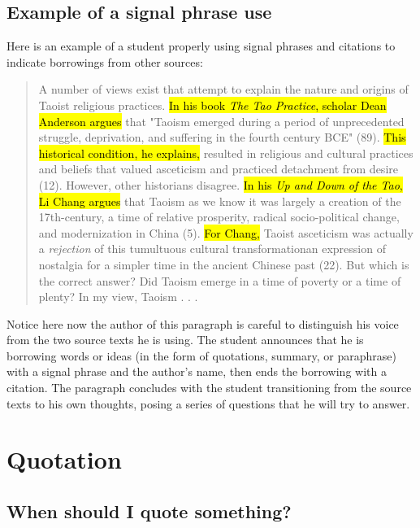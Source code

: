 \subsection{Example of a signal phrase use}

Here is an example of a student properly using signal phrases and citations to indicate borrowings from other sources:

\begin{quote}

A number of views exist that attempt to explain the nature and origins of Taoist religious practices. \hl{In his book \emph{The Tao Practice}, scholar Dean Anderson argues} that "Taoism emerged during a period of unprecedented struggle, deprivation, and suffering in the fourth century BCE" (89). \hl{This historical condition, he explains,} resulted in religious and cultural practices and beliefs that valued asceticism and practiced detachment from desire (12). However, other historians disagree. \hl{In his \emph{Up and Down of the Tao}, Li Chang argues} that Taoism as we know it was largely a creation of the 17th-century, a time of relative prosperity, radical socio-political change, and modernization in China (5). \hl{For Chang,} Taoist asceticism was actually a \emph{rejection} of this tumultuous cultural transformation\textemdash an expression of nostalgia for a simpler time in the ancient Chinese past (22). But which is the correct answer? Did Taoism emerge in a time of poverty or a time of plenty? In my view, Taoism . . .

\end{quote}


\noindent Notice here now the author of this paragraph is careful to distinguish his voice from the two source texts he is using. The student announces that he is borrowing words or ideas (in the form of quotations, summary, or paraphrase) with a signal phrase and the author's name, then ends the borrowing with a citation. The paragraph concludes with the student transitioning from the source texts to his own thoughts, posing a series of questions that he will try to answer. 


\hypertarget{quotation}{}
\section{Quotation}

\subsection{When should I quote something?}

